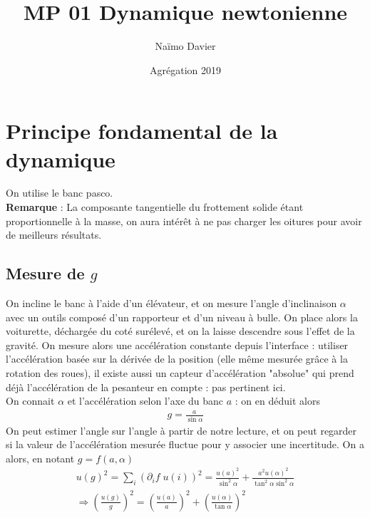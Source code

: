 \documentclass[12pt,prb,aps,epsf]{article}
\begin{document}
	
	\title{MP 01 Dynamique newtonienne}
	\author{Naïmo Davier}
	\date{Agrégation 2019}

	\maketitle
	
	\tableofcontents
	
	\pagebreak
	
	
\section{Principe fondamental de la dynamique}
On utilise le banc pasco.\\

\textbf{Remarque} : La composante tangentielle du frottement solide étant proportionnelle à la masse, on aura intérêt à ne pas charger les oitures pour avoir de meilleurs résultats.

\subsection{Mesure de $g$}
On incline le banc à l'aide d'un élévateur, et on mesure l'angle d'inclinaison $\alpha$ avec un outils composé d'un rapporteur et d'un niveau à bulle. On place alors la voiturette, déchargée du coté surélevé, et on la laisse descendre sous l'effet de la gravité. On mesure alors une accélération constante depuis l'interface : utiliser l'accélération basée sur la dérivée de la position (elle même mesurée grâce à la rotation des roues), il existe aussi un capteur d'accélération "absolue" qui prend déjà l'accélération de la pesanteur en compte : pas pertinent ici.\\

On connait $\alpha$ et l'accélération selon l'axe du banc $a$ : on en déduit alors 
\begin{eqnarray}
g = \frac{a}{\sin\alpha}
\end{eqnarray}
On peut estimer l'angle sur l'angle à partir de notre lecture, et on peut regarder si la valeur de l'accélération mesurée fluctue pour y associer une incertitude. On a alors, en notant $g = f(a, \alpha)$
\begin{eqnarray}
u(g)^2 =  \sum_i \left(\partial_if\;u(i)\right)^2 = \frac{u(a)^2}{\sin^2\alpha} + \frac{a^2u(\alpha)^2}{\tan^2\alpha\sin^2\alpha}\\
\Longrightarrow \left(\frac{u(g)}{g}\right)^2 = \left(\frac{u(a)}{a}\right)^2 + \left(\frac{u(\alpha)}{\tan\alpha}\right)^2
\end{eqnarray}
\end{document}
